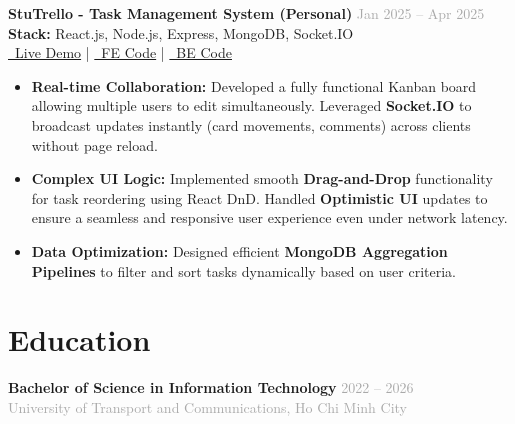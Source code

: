 \documentclass[10pt,a4paper]{article}
\newcommand{\projectitem}[5]{
    \noindent\begin{tcolorbox}[
        colback=white,
        colframe=lightgray,
        boxrule=0.5pt,
        arc=2pt,
        top=5pt, bottom=5pt, left=6pt, right=6pt
    ]
        \noindent\textbf{\color{primary}#1} \hfill \textcolor{darkgray}{\small #2}\\[2pt]
        {\small\textbf{Stack:} #3}\\[2pt]
        {\footnotesize\color{darkgray}#4}
        \vspace{3pt}
        #5
    \end{tcolorbox}
    \vspace{4pt}
}
\begin{document}
\projectitem{StuTrello - Task Management System (Personal)}{Jan 2025 -- Apr 2025}
{React.js, Node.js, Express, MongoDB, Socket.IO}
{\href{https://utc2-stutrello-taskboard-web.vercel.app/login}{\faGlobe \ Live Demo} | \href{https://github.com/dungken/stutrello-taskboard-web}{\faGithub \ FE Code} | \href{https://github.com/dungken/stutrello-taskboard-api}{\faGithub \ BE Code}}
{\begin{itemize}[leftmargin=12pt,itemsep=2pt,topsep=3pt,label={•}]
    \item \textbf{Real-time Collaboration:} Developed a fully functional Kanban board allowing multiple users to edit simultaneously. Leveraged \textbf{Socket.IO} to broadcast updates instantly (card movements, comments) across clients without page reload.
    \item \textbf{Complex UI Logic:} Implemented smooth \textbf{Drag-and-Drop} functionality for task reordering using React DnD. Handled \textbf{Optimistic UI} updates to ensure a seamless and responsive user experience even under network latency.
    \item \textbf{Data Optimization:} Designed efficient \textbf{MongoDB Aggregation Pipelines} to filter and sort tasks dynamically based on user criteria.
\end{itemize}}

\section{Education}
\noindent\textbf{Bachelor of Science in Information Technology} \hfill \textcolor{darkgray}{\small 2022 -- 2026}\\[1pt]
\textcolor{darkgray}{\small University of Transport and Communications, Ho Chi Minh City}
\end{document}
